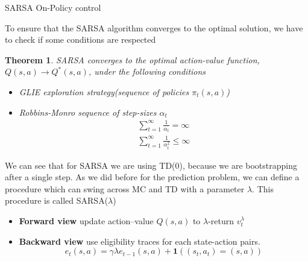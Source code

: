 \documentclass[main.tex]{subfiles}
\newtheorem{theorem}{Theorem}[section]
\begin{document}
\begin{algorithm}[H]
\SetAlgoLined
{}


\caption{SARSA On-Policy control}
\end{algorithm}
\par
\noindent
To ensure that the SARSA algorithm converges to the optimal solution, we have to check if some conditions are respected
\newpage
\begin{theorem}
SARSA converges to the optimal action-value function, $Q(s,a) \rightarrow Q^*(s,a)$, under the following conditions
\begin{itemize}
    \item GLIE exploration strategy(sequence of policies $\pi_t(s,a)$)
    \item Robbins-Monro sequence of step-sizes $\alpha_t$
    \begin{gather*}
        \sum_{t=1}^{\infty} \frac{1}{\alpha_t} = \infty \\
        \sum_{t=1}^{\infty} \frac{1}{\alpha_t^2} \leq \infty
    \end{gather*}
\end{itemize}
\end{theorem}
We can see that for SARSA we are using TD(0), because we are bootstrapping after a single step. As we did before for the prediction problem, we can define a procedure which can swing across MC and TD with a parameter $\lambda$. This procedure is called SARSA($\lambda$)
\begin{itemize}
    \item \textbf{Forward view} update action–value $Q(s,a)$ to $\lambda$-return $v_t^{\lambda}$
    \item \textbf{Backward view} use eligibility traces for each state-action pairs.
    \begin{equation*}
        e_t(s,a) = \gamma \lambda e_{t-1}(s,a) + \mathbf{1}((s_t,a_t) = (s,a))
    \end{equation*}
\end{itemize}
\end{document}
